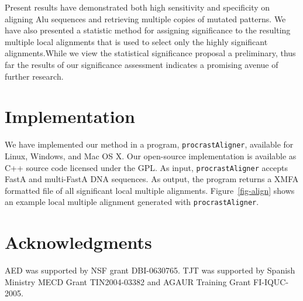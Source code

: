 \documentclass[twoside,11pt]{article}
\begin{document}
Present results have demonstrated both high sensitivity and specificity on aligning Alu
sequences and retrieving multiple copies of mutated patterns. We have also presented a statistic method for assigning significance to the resulting multiple local alignments that is used to select only the highly significant alignments.While we view the statistical significance proposal a preliminary, thus far the results of our significance assessment indicates a promising avenue of further research.

\section{Implementation}
We have implemented our method in a program, \texttt{procrastAligner}, available for Linux, Windows, and Mac OS X. Our open-source implementation is available as C++ source code licensed under the GPL. As input, \texttt{procrastAligner} accepts FastA and multi-FastA DNA sequences. As output, the program returns a XMFA formatted file of all significant local multiple alignments. Figure~\ref{fig-align} shows an example local multiple alignment generated with \texttt{procrastAligner}.

\section{ Acknowledgments }
AED was supported by NSF grant DBI-0630765. TJT was
supported by Spanish Ministry MECD Grant TIN2004-03382 and AGAUR
Training Grant FI-IQUC-2005.

\small

\end{document}
